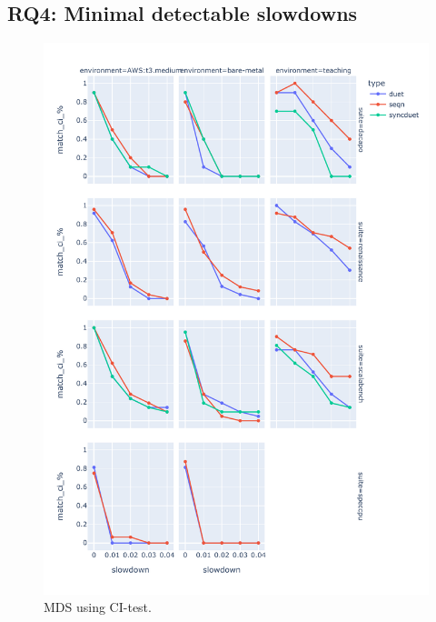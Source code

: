 \subsection{RQ4: Minimal detectable slowdowns}
\label{sec:rq4}

\begin{figure}
	\centering
	\includegraphics[width=1\linewidth]{./figures/mds_citest.pdf}
	\caption{
    MDS using CI-test.
	}
	\label{fig:mds_citest}
\end{figure}

